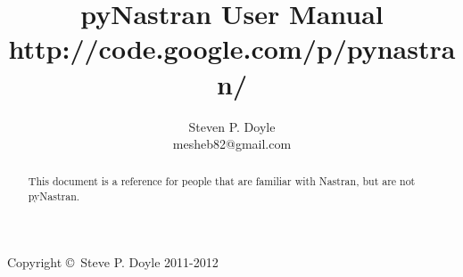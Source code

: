 \documentclass[a4paper,12pt]{article}
\begin{document}
\title{pyNastran User Manual \\
\small http://code.google.com/p/pynastran/ }
\author{Steven P. Doyle\\
{\small mesheb82@gmail.com}
}

\maketitle

\begin{abstract}
This document is a reference for people that are familiar with Nastran, but are not pyNastran.
\end{abstract}

Copyright \copyright\ Steve P. Doyle 2011-2012
\newpage

\tableofcontents
\newpage


\newpage

%


%


%
%
%
%

%
%
\end{document}
